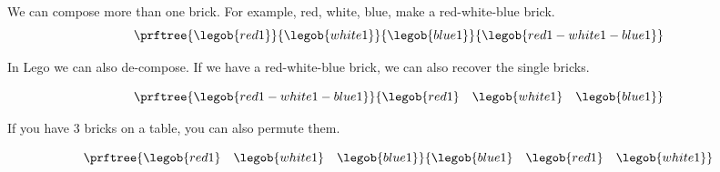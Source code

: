 We can compose more than one brick.
For example, red, white, blue, make a red-white-blue brick.
\begin{equation}
\prftree{\legob{red1}}{\legob{white1}}{\legob{blue1}}{\legob{red1-white1-blue1}}
\end{equation}

In Lego we can also de-compose. If we have a red-white-blue brick, we can also recover
the single bricks.

\begin{equation}
  \prftree{\legob{red1-white1-blue1}}{\legob{red1}\quad\legob{white1}\quad \legob{blue1} }
  \end{equation}

If you have 3 bricks on a table, you can also permute them.


\begin{equation}
\prftree{\legob{red1}\quad\legob{white1}\quad \legob{blue1}}{\legob{blue1}\quad\legob{red1}\quad \legob{white1} }
\end{equation}

